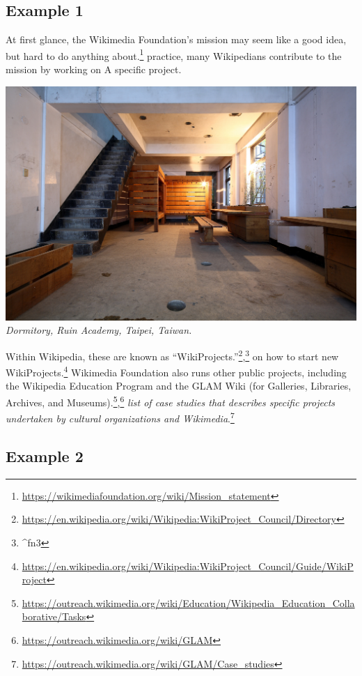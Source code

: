 \hypertarget{example-1}{%
\subsection{Example 1}\label{example-1}}

At first glance, the Wikimedia Foundation's mission may seem like a good
idea, but hard to do anything about.\footnote{\url{https://wikimediafoundation.org/wiki/Mission_statement}}
practice, many Wikipedians contribute to the mission by working on {{A
specific project}}.

\includegraphics{images/Ruin_Academy_Dorm.jpg} \emph{Dormitory, Ruin
Academy, Taipei, Taiwan.}

Within Wikipedia, these are known as
``WikiProjects.''\footnote{\url{https://en.wikipedia.org/wiki/Wikipedia:WikiProject_Council/Directory}},\footnote{\^{}fn3}
on how to start new WikiProjects.\footnote{\url{https://en.wikipedia.org/wiki/Wikipedia:WikiProject_Council/Guide/WikiProject}}
Wikimedia Foundation also runs other public projects, including the
Wikipedia Education Program and the GLAM Wiki (for Galleries, Libraries,
Archives, and Museums).\footnote{\url{https://outreach.wikimedia.org/wiki/Education/Wikipedia_Education_Collaborative/Tasks}},\footnote{\url{https://outreach.wikimedia.org/wiki/GLAM}}
\emph{list of case studies that describes specific projects undertaken
by cultural organizations and Wikimedia}.\footnote{\url{https://outreach.wikimedia.org/wiki/GLAM/Case_studies}}

\hypertarget{example-2}{%
\subsection{Example 2}\label{example-2}}

